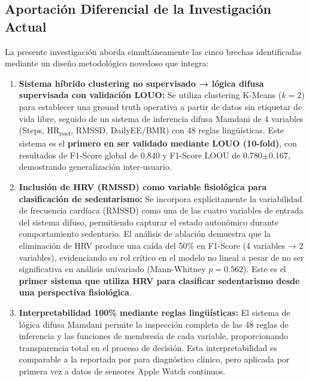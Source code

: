 
\subsection{Aportación Diferencial de la Investigación Actual}
\label{subsec:aportacion_diferencial}

La presente investigación aborda simultáneamente las cinco brechas identificadas mediante un diseño metodológico novedoso que integra:

\begin{enumerate}
    \item \textbf{Sistema híbrido clustering no supervisado → lógica difusa supervisada con validación LOUO:} Se utiliza clustering K-Means ($k=2$) para establecer una ground truth operativa a partir de datos sin etiquetar de vida libre, seguido de un sistema de inferencia difusa Mamdani de 4 variables (Steps, HR\textsubscript{rest}, RMSSD, DailyEE/BMR) con 48 reglas lingüísticas. Este sistema es el \textbf{primero en ser validado mediante LOUO (10-fold)}, con resultados de F1-Score global de 0.840 y F1-Score LOOU de 0.780$\pm$0.167, demostrando generalización inter-usuario.
    
    \item \textbf{Inclusión de HRV (RMSSD) como variable fisiológica para clasificación de sedentarismo:} Se incorpora explícitamente la variabilidad de frecuencia cardíaca (RMSSD) como una de las cuatro variables de entrada del sistema difuso, permitiendo capturar el estado autonómico durante comportamiento sedentario. El análisis de ablación demuestra que la eliminación de HRV produce una caída del 50\% en F1-Score (4 variables → 2 variables), evidenciando su rol crítico en el modelo no lineal a pesar de no ser significativa en análisis univariado (Mann-Whitney $p=0.562$). Este es el \textbf{primer sistema que utiliza HRV para clasificar sedentarismo desde una perspectiva fisiológica}.
    
    \item \textbf{Interpretabilidad 100\% mediante reglas lingüísticas:} El sistema de lógica difusa Mamdani permite la inspección completa de las 48 reglas de inferencia y las funciones de membresía de cada variable, proporcionando transparencia total en el proceso de decisión. Esta interpretabilidad es comparable a la reportada por \cite{Capitoli2025FuzzyXAI} para diagnóstico clínico, pero aplicada por primera vez a datos de sensores Apple Watch continuos.
    

\end{enumerate}

